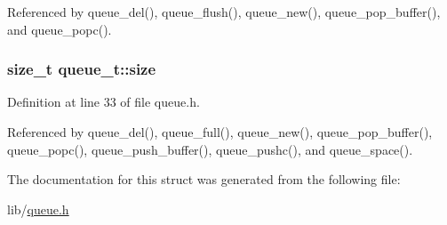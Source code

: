 Referenced by queue\-\_\-del(), queue\-\_\-flush(), queue\-\_\-new(), queue\-\_\-pop\-\_\-buffer(), and queue\-\_\-popc().

\hypertarget{structqueue__t_a83a13b888f9d4ef127d706559818b779}{
\subsubsection[{size}]{\setlength{\rightskip}{0pt plus 5cm}size\-\_\-t queue\-\_\-t\-::size}}\label{structqueue__t_a83a13b888f9d4ef127d706559818b779}


Definition at line 33 of file queue.\-h.



Referenced by queue\-\_\-del(), queue\-\_\-full(), queue\-\_\-new(), queue\-\_\-pop\-\_\-buffer(), queue\-\_\-popc(), queue\-\_\-push\-\_\-buffer(), queue\-\_\-pushc(), and queue\-\_\-space().



The documentation for this struct was generated from the following file\-:\begin{DoxyCompactItemize}
\item 
lib/\hyperlink{queue_8h}{queue.\-h}\end{DoxyCompactItemize}
